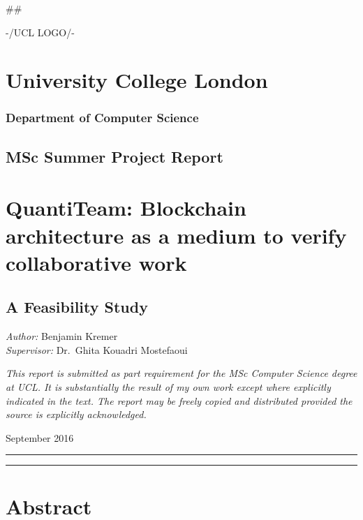 \documentclass[12pt]{report}
\date{}
\begin{document}
\#\#

-/UCL LOGO/-

\section{University College London}\label{university-college-london}

\subsubsection{Department of Computer
Science}\label{department-of-computer-science}

\subsection{MSc Summer Project Report}\label{msc-summer-project-report}

\section{QuantiTeam: Blockchain architecture as a medium to verify
collaborative
work}\label{quantiteam-blockchain-architecture-as-a-medium-to-verify-collaborative-work}

\subsection{A Feasibility Study}\label{a-feasibility-study}

\emph{Author:} Benjamin Kremer\\
\emph{Supervisor:} Dr.~Ghita Kouadri Mostefaoui

\emph{This report is submitted as part requirement for the MSc Computer
Science degree at UCL. It is substantially the result of my own work
except where explicitly indicated in the text. The report may be freely
copied and distributed provided the source is explicitly acknowledged.}

September 2016

\begin{center}\rule{0.5\linewidth}{\linethickness}\end{center}

\begin{center}\rule{0.5\linewidth}{\linethickness}\end{center}

\section{Abstract}\label{abstract}
\end{document}

